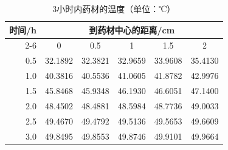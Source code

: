 \begin{table}[!htbp]
\centering
\small
\caption{3小时内药材的温度（单位：℃）}
\label{tab:q2-temperature}
\setlength{\tabcolsep}{9pt}
\renewcommand{\arraystretch}{1.12}
\begin{tabular*}{0.86\textwidth}{@{\extracolsep{\fill}}rccccc}
\toprule
时间/h & \multicolumn{5}{c}{到药材中心的距离/cm} \\
\cmidrule(lr){2-6}
 & 0 & 0.5 & 1 & 1.5 & 2 \\
\midrule
0.5 & 32.1892 & 32.3821 & 32.9659 & 33.9608 & 35.4130 \\
1.0 & 40.3816 & 40.5536 & 41.0605 & 41.8782 & 42.9976 \\
1.5 & 45.8468 & 45.9348 & 46.1930 & 46.6051 & 47.1400 \\
2.0 & 48.4502 & 48.4881 & 48.5984 & 48.7736 & 49.0033 \\
2.5 & 49.4670 & 49.4792 & 49.5136 & 49.5653 & 49.6609 \\
3.0 & 49.8495 & 49.8553 & 49.8746 & 49.9101 & 49.9664 \\
\bottomrule
\end{tabular*}
\end{table}
